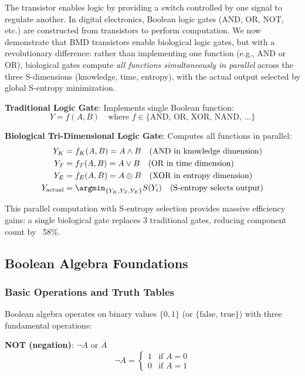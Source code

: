 \documentclass[11pt,a4paper]{article}
\begin{document}
The transistor enables logic by providing a switch controlled by one signal to regulate another. In digital electronics, Boolean logic gates (AND, OR, NOT, etc.) are constructed from transistors to perform computation\cite{shannon1937symbolic}. We now demonstrate that BMD transistors enable biological logic gates, but with a revolutionary difference: rather than implementing one function (e.g., AND or OR), biological gates compute \textit{all functions simultaneously in parallel} across the three S-dimensions (knowledge, time, entropy), with the actual output selected by global S-entropy minimization.

\textbf{Traditional Logic Gate}: Implements single Boolean function:
\begin{equation}
Y = f(A, B) \quad \text{where } f \in \{\text{AND, OR, XOR, NAND, \ldots}\}
\end{equation}

\textbf{Biological Tri-Dimensional Logic Gate}: Computes all functions in parallel:
\begin{align}
Y_K &= f_K(A, B) = A \land B \quad \text{(AND in knowledge dimension)} \\
Y_T &= f_T(A, B) = A \lor B \quad \text{(OR in time dimension)} \\
Y_E &= f_E(A, B) = A \oplus B \quad \text{(XOR in entropy dimension)} \\
Y_{\text{actual}} &= \argmin_{\{Y_K, Y_T, Y_E\}} S(Y_i) \quad \text{(S-entropy selects output)}
\end{align}

This parallel computation with S-entropy selection provides massive efficiency gains: a single biological gate replaces 3 traditional gates, reducing component count by ~58\%.

\subsection{Boolean Algebra Foundations}

\subsubsection{Basic Operations and Truth Tables}

Boolean algebra operates on binary values $\{0, 1\}$ (or $\{\text{false, true}\}$) with three fundamental operations\cite{boole1854investigation}:

\textbf{NOT (negation)}: $\neg A$ or $\overline{A}$
\begin{equation}
\neg A = \begin{cases} 1 & \text{if } A = 0 \\ 0 & \text{if } A = 1 \end{cases}
\end{equation}
\end{document}
